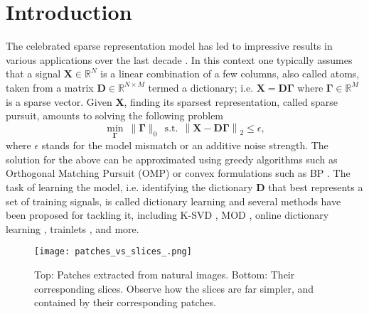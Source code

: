 \documentclass[10pt,twocolumn,letterpaper]{article}
\def\X{{\mathbf X}}
\def\D{{\mathbf D}}
\def\Gama{{\boldsymbol \Gamma}}
\begin{document}
\section{Introduction}
The celebrated sparse representation model has led to impressive results in various applications over the last decade \cite{elad2006image,aharon2006rm,wright2009robust,yang2010image,Dong2011}. In this context one typically assumes that a signal $\X \in \mathbb{R}^N$ is a linear combination of a few columns, also called atoms, taken from a matrix $\D \in \mathbb{R}^{N \times M}$ termed a dictionary; i.e. $\X = \D \Gama$ where $\Gama \in \mathbb{R}^M$ is a sparse vector. Given $\X$, finding its sparsest representation, called sparse pursuit, amounts to solving the following problem
\begin{equation} \label{Eq:saprse_coding}
\min_{ \Gama } \ \| \Gama \|_0 \ \ \text{s.t.} \ \ \left\| \X - \D \Gama \right\|_2 \leq \epsilon,
\end{equation}
where $\epsilon$ stands for the model mismatch or an additive noise strength.
The solution for the above can be approximated using greedy algorithms such as Orthogonal Matching Pursuit (OMP) \cite{Chen1989} or convex formulations such as BP \cite{Chen2001}. The task of learning the model, i.e. identifying the dictionary $\D$ that best represents a set of training signals, is called dictionary learning and several methods have been proposed for tackling it, including K-SVD \cite{aharon2006rm}, MOD \cite{engan1999method}, online dictionary learning \cite{mairal2009online}, trainlets \cite{sulam2016trainlets}, and more.

\begin{figure*}[t!]
	\centering
	\texttt{[image: patches\_vs\_slices\_.png]}
	\caption{Top: Patches extracted from natural images. Bottom: Their corresponding slices. Observe how the slices are far simpler, and contained by their corresponding patches.}
	\label{Fig:patches_vs_slices}
	\vspace{-.35cm}
\end{figure*}
\end{document}
